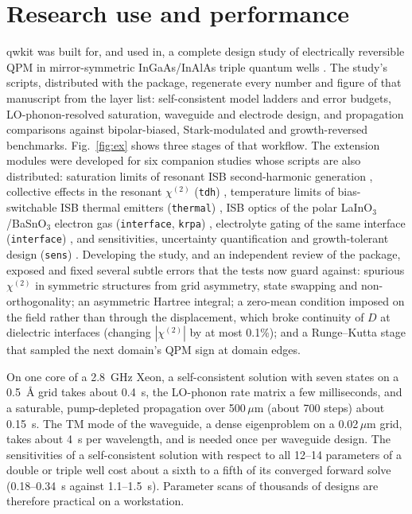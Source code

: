 \documentclass[11pt]{article}
\newcommand{\chitwo}{\chi^{(2)}}
\newcommand{\um}{\,\mu\mathrm{m}}
\newcommand{\code}[1]{\texttt{#1}}
\begin{document}
\section{Research use and performance}
qwkit was built for, and used in, a complete design study of electrically reversible QPM in mirror-symmetric InGaAs/InAlAs triple quantum wells \cite{Ownby2026N1}. The study's scripts, distributed with the package, regenerate every number and figure of that manuscript from the layer list: self-consistent model ladders and error budgets, LO-phonon-resolved saturation, waveguide and electrode design, and propagation comparisons against bipolar-biased, Stark-modulated and growth-reversed benchmarks. Fig.~\ref{fig:ex} shows three stages of that workflow. The extension modules were developed for six companion studies whose scripts are also distributed: saturation limits of resonant ISB second-harmonic generation \cite{OwnbyNL02}, collective effects in the resonant $\chitwo$ (\code{tdh}) \cite{OwnbyNL05}, temperature limits of bias-switchable ISB thermal emitters (\code{thermal}) \cite{OwnbyTPV05}, ISB optics of the polar LaInO$_3$/BaSnO$_3$ electron gas (\code{interface}, \code{krpa}) \cite{OwnbyMAT01}, electrolyte gating of the same interface (\code{interface}) \cite{OwnbyMAT02}, and sensitivities, uncertainty quantification and growth-tolerant design (\code{sens}) \cite{OwnbyMS02}. Developing the study, and an independent review of the package, exposed and fixed several subtle errors that the tests now guard against: spurious $\chitwo$ in symmetric structures from grid asymmetry, state swapping and non-orthogonality; an asymmetric Hartree integral; a zero-mean condition imposed on the field rather than through the displacement, which broke continuity of $D$ at dielectric interfaces (changing $|\chitwo|$ by at most 0.1\%); and a Runge--Kutta stage that sampled the next domain's QPM sign at domain edges.

On one core of a 2.8~GHz Xeon, a self-consistent solution with seven states on a 0.5~\AA{} grid takes about 0.4~s, the LO-phonon rate matrix a few milliseconds, and a saturable, pump-depleted propagation over 500$\um$ (about 700 steps) about 0.15~s. The TM mode of the waveguide, a dense eigenproblem on a 0.02$\um$ grid, takes about 4~s per wavelength, and is needed once per waveguide design. The sensitivities of a self-consistent solution with respect to all 12--14 parameters of a double or triple well cost about a sixth to a fifth of its converged forward solve (0.18--0.34~s against 1.1--1.5~s). Parameter scans of thousands of designs are therefore practical on a workstation.
\end{document}
